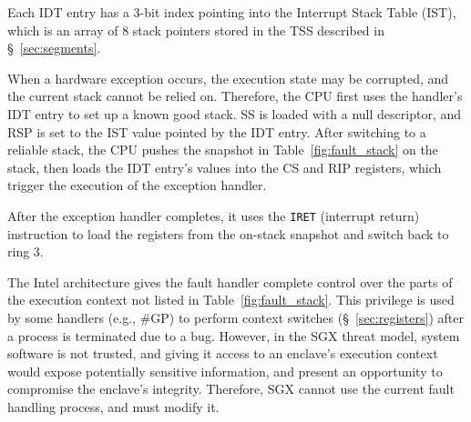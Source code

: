 Each IDT entry has a 3-bit index pointing into the Interrupt Stack Table (IST),
which is an array of 8 stack pointers stored in the TSS described in
\S~\ref{sec:segments}.


When a hardware exception occurs, the execution state may be corrupted, and the
current stack cannot be relied on. Therefore, the CPU first uses the handler's
IDT entry to set up a known good stack. SS is loaded with a null descriptor,
and RSP is set to the IST value pointed by the IDT entry. After switching to a
reliable stack, the CPU pushes the snapshot in Table~\ref{fig:fault_stack} on
the stack, then loads the IDT entry's values into the CS and RIP registers,
which trigger the execution of the exception handler.

\begin{table}[hbt]
  \caption{
    The snapshot pushed on the handler's stack when a hardware exception
    occurs. IRET restores registers from this snapshot.
  }
  \label{fig:fault_stack}
\end{table}

After the exception handler completes, it uses the \texttt{IRET} (interrupt
return) instruction to load the registers from the on-stack snapshot and switch
back to ring 3.

The Intel architecture gives the fault handler complete control over the parts
of the execution context not listed in Table~\ref{fig:fault_stack}. This
privilege is used by some handlers (e.g., \#GP) to perform context switches
(\S~\ref{sec:registers}) after a process is terminated due to a bug. However,
in the SGX threat model, system software is not trusted, and giving it access
to an enclave's execution context would expose potentially sensitive
information, and present an opportunity to compromise the enclave's integrity.
Therefore, SGX cannot use the current fault handling process, and must modify
it.


